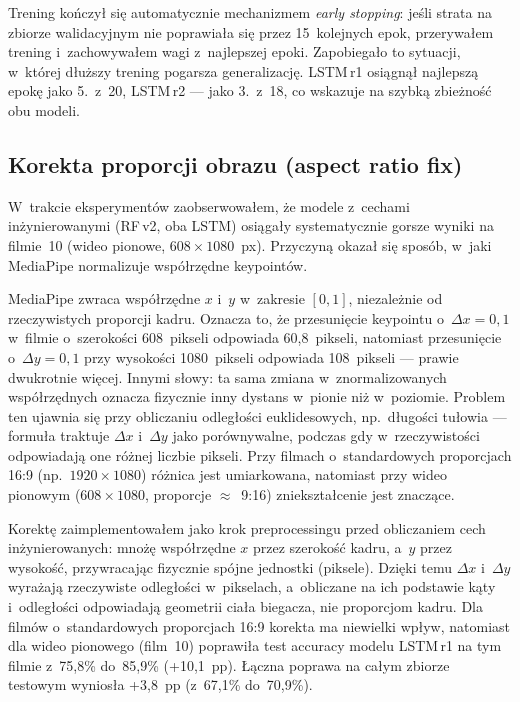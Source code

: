 Trening kończył się automatycznie mechanizmem \textit{early stopping}: jeśli strata na zbiorze walidacyjnym nie poprawiała się przez 15~kolejnych epok, przerywałem trening i~zachowywałem wagi z~najlepszej epoki. Zapobiegało to sytuacji, w~której dłuższy trening pogarsza generalizację. LSTM\,r1 osiągnął najlepszą epokę jako 5.~z~20, LSTM\,r2 --- jako 3.~z~18, co wskazuje na szybką zbieżność obu modeli.

\subsection{Korekta proporcji obrazu (aspect ratio fix)}
\label{sec:aspect-fix}

W~trakcie eksperymentów zaobserwowałem, że modele z~cechami inżynierowanymi (RF\,v2, oba LSTM) osiągały systematycznie gorsze wyniki na filmie~10 (wideo pionowe, $608 \times 1080$~px). Przyczyną okazał się sposób, w~jaki MediaPipe normalizuje współrzędne keypointów.

MediaPipe zwraca współrzędne $x$ i~$y$ w~zakresie $[0, 1]$, niezależnie od rzeczywistych proporcji kadru. Oznacza to, że przesunięcie keypointu o~$\Delta x = 0{,}1$ w~filmie o~szerokości 608~pikseli odpowiada 60{,}8~pikseli, natomiast przesunięcie o~$\Delta y = 0{,}1$ przy wysokości 1080~pikseli odpowiada 108~pikseli --- prawie dwukrotnie więcej. Innymi słowy: ta sama zmiana w~znormalizowanych współrzędnych oznacza fizycznie inny dystans w~pionie niż w~poziomie. Problem ten ujawnia się przy obliczaniu odległości euklidesowych, np.~długości tułowia --- formuła traktuje $\Delta x$ i~$\Delta y$ jako porównywalne, podczas gdy w~rzeczywistości odpowiadają one różnej liczbie pikseli. Przy filmach o~standardowych proporcjach 16:9 (np.~$1920 \times 1080$) różnica jest umiarkowana, natomiast przy wideo pionowym ($608 \times 1080$, proporcje $\approx$~9:16) zniekształcenie jest znaczące.

Korektę zaimplementowałem jako krok preprocessingu przed obliczaniem cech inżynierowanych: mnożę współrzędne $x$ przez szerokość kadru, a~$y$ przez wysokość, przywracając fizycznie spójne jednostki (piksele). Dzięki temu $\Delta x$ i~$\Delta y$ wyrażają rzeczywiste odległości w~pikselach, a~obliczane na ich podstawie kąty i~odległości odpowiadają geometrii ciała biegacza, nie proporcjom kadru. Dla filmów o~standardowych proporcjach 16:9 korekta ma niewielki wpływ, natomiast dla wideo pionowego (film~10) poprawiła test accuracy modelu LSTM\,r1 na tym filmie z~75{,}8\% do~85{,}9\% (+10{,}1~pp). Łączna poprawa na całym zbiorze testowym wyniosła +3{,}8~pp (z~67{,}1\% do~70{,}9\%).

